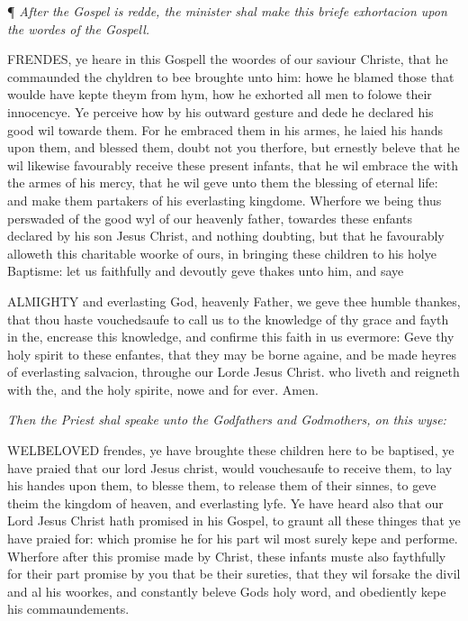 ¶
\emph{After the Gospel is redde, the minister shal make this briefe exhortacion
upon the wordes of the Gospell.}

FRENDES,
ye heare in this Gospell the woordes of our saviour Christe, that he commaunded
the chyldren to bee broughte unto him: howe he blamed those that woulde
have kepte theym from hym, how he exhorted all men to folowe their innocencye.
Ye perceive how by his outward gesture and dede he declared his good wil
towarde them. For he embraced them in his armes, he laied his hands upon
them, and blessed them, doubt not you therfore, but ernestly beleve that
he wil likewise favourably receive these present infants, that he wil
embrace the with the armes of his mercy, that he wil geve unto them the
blessing of eternal life: and make them partakers of his everlasting kingdome.
Wherfore we being thus perswaded of the good wyl of our heavenly father,
towardes these enfants declared by his son Jesus Christ, and nothing doubting,
but that he favourably alloweth this charitable woorke of ours, in bringing
these children to his holye Baptisme: let us faithfully and devoutly geve
thakes unto him, and saye

ALMIGHTY
and everlasting God, heavenly Father, we geve thee humble thankes, that
thou haste vouchedsaufe to call us to the knowledge of thy grace and fayth
in the, encrease this knowledge, and confirme this faith in us evermore:
Geve thy holy spirit to these enfantes, that they may be borne againe,
and be made heyres of everlasting salvacion, throughe our Lorde Jesus
Christ. who liveth and reigneth with the, and the holy spirite, nowe and
for ever. Amen.

\emph{Then
the Priest shal speake unto the Godfathers and Godmothers, on this wyse:}

WELBELOVED
frendes, ye have broughte these children here to be baptised, ye have
praied that our lord Jesus christ, would vouchesaufe to receive them,
to lay his handes upon them, to blesse them, to release them of their
sinnes, to geve theim the kingdom of heaven, and everlasting lyfe. Ye
have heard also that our Lord Jesus Christ hath promised in his Gospel,
to graunt all these thinges that ye have praied for: which promise he
for his part wil most surely kepe and performe. Wherfore after this promise
made by Christ, these infants muste also faythfully for their part promise
by you that be their sureties, that they wil forsake the divil and al
his woorkes, and constantly beleve Gods holy word, and obediently kepe
his commaundements.

